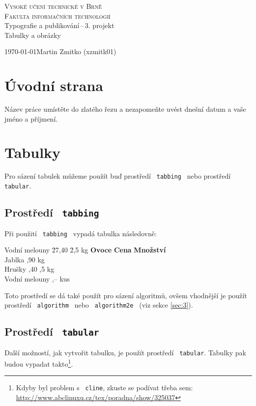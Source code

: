 \documentclass[11pt]{article}
\begin{document}
\begin{titlepage}
\begin{center}
{\Huge \textsc{Vysoké učení technické v Brně}\\
\bigskip
{\huge \textsc{Fakulta informačních technologií}}} \\
{\LARGE Typografie a publikování\,--\,3. projekt}\\
\medskip
{\Huge Tabulky a obrázky} \\
\end{center}
{\Large \today \hfill Martin Zmitko (xzmitk01)}
\end{titlepage}

\section{Úvodní strana}
Název práce umístěte do zlatého řezu a nezapomeňte uvést dnešní datum a vaše jméno a příjmení.

\section{Tabulky}
Pro sázení tabulek můžeme použít buď prostředí \texttt{ tabbing } nebo prostředí \texttt{ tabular}.

\subsection{Prostředí \texttt{ tabbing}}
Při použití \texttt{ tabbing } vypadá tabulka následovně:
\begin{tabbing}
Vodní melouny \quad \= 27,40 \quad \= 2,5 kg \kill
\textbf{Ovoce} \> \textbf{Cena} \> \textbf{Množství}\\
Jablka ,90  kg\\
Hrušky ,40 ,5 kg\\
Vodní melouny ,--  kus
\end{tabbing}
\bigskip
Toto prostředí se dá také použít pro sázení algoritmů, ovšem vhodnější je použít 
prostředí \texttt{ algorithm } nebo \texttt{ algorithm2e } (viz sekce \ref{sec:3}).

\subsection{Prostředí \texttt{ tabular}}
Další možností, jak vytvořit tabulku, je použít prostředí \texttt{ tabular}. Tabulky pak 
budou vypadat takto\footnote{Kdyby byl problem s \texttt{ cline}, zkuste se podívat třeba sem: 
\url{http://www.abclinuxu.cz/tex/poradna/show/325037}}.
\bigskip
\end{document}
